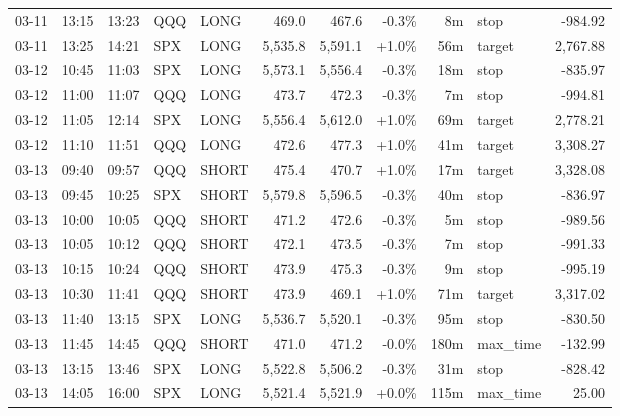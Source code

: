 \documentclass[11pt,a4paper,twoside]{article}
\begin{document}
\begin{center}
\begin{longtable}{>{\color{txtmain}}l l l l l r r r r >{\color{txtmain}}l r}
03-11 & 13:15 & 13:23 & QQQ & LONG & 469.0 & 467.6 & \textcolor{lossred}{-0.3\%} & 8m & stop & \textcolor{lossred}{-984.92} \\
03-11 & 13:25 & 14:21 & SPX & LONG & 5,535.8 & 5,591.1 & \textcolor{wingreen}{+1.0\%} & 56m & target & \textcolor{wingreen}{2,767.88} \\
03-12 & 10:45 & 11:03 & SPX & LONG & 5,573.1 & 5,556.4 & \textcolor{lossred}{-0.3\%} & 18m & stop & \textcolor{lossred}{-835.97} \\
03-12 & 11:00 & 11:07 & QQQ & LONG & 473.7 & 472.3 & \textcolor{lossred}{-0.3\%} & 7m & stop & \textcolor{lossred}{-994.81} \\
03-12 & 11:05 & 12:14 & SPX & LONG & 5,556.4 & 5,612.0 & \textcolor{wingreen}{+1.0\%} & 69m & target & \textcolor{wingreen}{2,778.21} \\
03-12 & 11:10 & 11:51 & QQQ & LONG & 472.6 & 477.3 & \textcolor{wingreen}{+1.0\%} & 41m & target & \textcolor{wingreen}{3,308.27} \\
03-13 & 09:40 & 09:57 & QQQ & SHORT & 475.4 & 470.7 & \textcolor{wingreen}{+1.0\%} & 17m & target & \textcolor{wingreen}{3,328.08} \\
03-13 & 09:45 & 10:25 & SPX & SHORT & 5,579.8 & 5,596.5 & \textcolor{lossred}{-0.3\%} & 40m & stop & \textcolor{lossred}{-836.97} \\
03-13 & 10:00 & 10:05 & QQQ & SHORT & 471.2 & 472.6 & \textcolor{lossred}{-0.3\%} & 5m & stop & \textcolor{lossred}{-989.56} \\
03-13 & 10:05 & 10:12 & QQQ & SHORT & 472.1 & 473.5 & \textcolor{lossred}{-0.3\%} & 7m & stop & \textcolor{lossred}{-991.33} \\
03-13 & 10:15 & 10:24 & QQQ & SHORT & 473.9 & 475.3 & \textcolor{lossred}{-0.3\%} & 9m & stop & \textcolor{lossred}{-995.19} \\
03-13 & 10:30 & 11:41 & QQQ & SHORT & 473.9 & 469.1 & \textcolor{wingreen}{+1.0\%} & 71m & target & \textcolor{wingreen}{3,317.02} \\
03-13 & 11:40 & 13:15 & SPX & LONG & 5,536.7 & 5,520.1 & \textcolor{lossred}{-0.3\%} & 95m & stop & \textcolor{lossred}{-830.50} \\
03-13 & 11:45 & 14:45 & QQQ & SHORT & 471.0 & 471.2 & \textcolor{lossred}{-0.0\%} & 180m & max\_time & \textcolor{lossred}{-132.99} \\
03-13 & 13:15 & 13:46 & SPX & LONG & 5,522.8 & 5,506.2 & \textcolor{lossred}{-0.3\%} & 31m & stop & \textcolor{lossred}{-828.42} \\
03-13 & 14:05 & 16:00 & SPX & LONG & 5,521.4 & 5,521.9 & \textcolor{wingreen}{+0.0\%} & 115m & max\_time & \textcolor{wingreen}{25.00} \\

\end{longtable}
\end{center}
\end{document}
